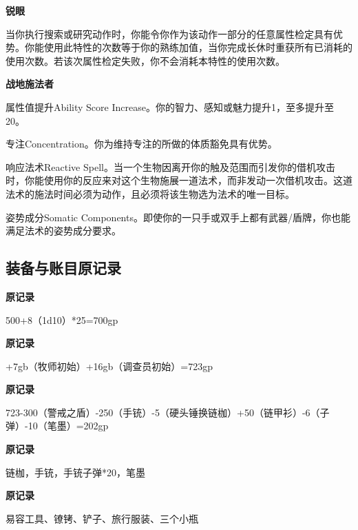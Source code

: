 \documentclass[letterpaper,openany,twoside,twocolumn]{book}
\begin{document}
\par\noindent\textbf{锐眼}\par
当你执行搜索或研究动作时，你能令你作为该动作一部分的任意属性检定具有优势。你能使用此特性的次数等于你的熟练加值，当你完成长休时重获所有已消耗的使用次数。若该次属性检定失败，你不会消耗本特性的使用次数。\par


\par\noindent\textbf{战地施法者}\par
属性值提升Ability Score Increase。你的智力、感知或魅力提升1，至多提升至20。\par
专注Concentration。你为维持专注的所做的体质豁免具有优势。\par
响应法术Reactive Spell。当一个生物因离开你的触及范围而引发你的借机攻击时，你能使用你的反应来对这个生物施展一道法术，而非发动一次借机攻击。这道法术的施法时间必须为动作，且必须将该生物选为法术的唯一目标。\par
姿势成分Somatic Components。即使你的一只手或双手上都有武器/盾牌，你也能满足法术的姿势成分要求。\par


\subsection*{装备与账目原记录}

\par\noindent\textbf{原记录}\par
500+8（1d10）*25=700gp\par


\par\noindent\textbf{原记录}\par
+7gb（牧师初始）+16gb（调查员初始）=723gp\par


\par\noindent\textbf{原记录}\par
723-300（警戒之盾）-250（手铳）-5（硬头锤换链枷）+50（链甲衫）-6（子弹）-10（笔墨）=202gp\par


\par\noindent\textbf{原记录}\par
链枷，手铳，手铳子弹*20，笔墨\par


\par\noindent\textbf{原记录}\par
易容工具、镣铐、铲子、旅行服装、三个小瓶\par
\end{document}
